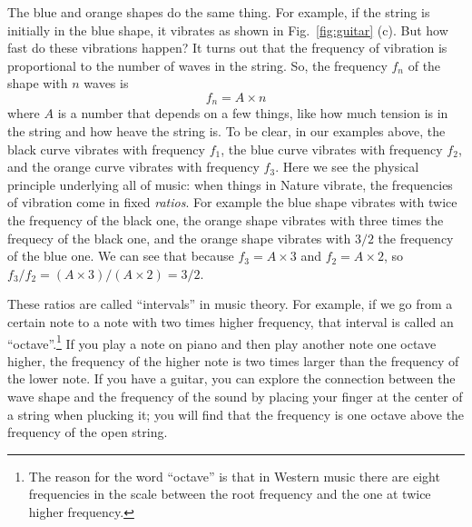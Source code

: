 \documentclass{article}
\begin{document}
The blue and orange shapes do the same thing.
For example, if the string is initially in the blue shape, it vibrates as shown in Fig.~\ref{fig:guitar} (c).
But how fast do these vibrations happen?
It turns out that the frequency of vibration is proportional to the number of waves in the string.
So, the frequency $f_n$ of the shape with $n$ waves is
\begin{equation}
  f_n = A \times n
\end{equation}
where $A$ is a number that depends on a few things, like how much tension is in the string and how heave the string is.
To be clear, in our examples above, the black curve vibrates with frequency $f_1$, the blue curve vibrates with frequency $f_2$, and the orange curve vibrates with frequency $f_3$.
Here we see the physical principle underlying all of music: when things in Nature vibrate, the frequencies of vibration come in fixed \emph{ratios}.
For example the blue shape vibrates with twice the frequency of the black one, the orange shape vibrates with three times the frequecy of the black one, and the orange shape vibrates with $3/2$ the frequency of the blue one.
We can see that because $f_3 = A \times 3$ and $f_2 = A \times 2$, so $f_3 / f_2 = (A \times 3) / (A \times 2) = 3/2$.

These ratios are called ``intervals'' in music theory.
For example, if we go from a certain note to a note with two times higher frequency, that interval is called an ``octave''.\footnote{The reason for the word ``octave'' is that in Western music there are eight frequencies in the scale between the root frequency and the one at twice higher frequency.}
If you play a note on piano and then play another note one octave higher, the frequency of the higher note is two times larger than the frequency of the lower note.
If you have a guitar, you can explore the connection between the wave shape and the frequency of the sound by placing your finger at the center of a string when plucking it; you will find that the frequency is one octave above the frequency of the open string.




\end{document}
